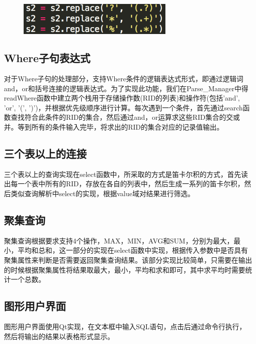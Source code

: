 \begin{figure}[H]
\centering
\includegraphics[width=3in]{Figures/vague.png}
\end{figure}

\subsection{Where子句表达式}

对于Where子句的处理部分，支持Where条件的逻辑表达式形式，即通过逻辑词and，or和括号连接的逻辑表达式。为了实现此功能，我们在Parse\_Manager中得readWhere函数中建立两个栈用于存储操作数(RID的列表)和操作符(包括'and', 'or', '(', ')')，并根据优先级顺序进行计算。每次遇到一个条件，首先通过search函数查找符合此条件的RID的集合，然后通过and，or运算求这些RID集合的交或并。等到所有的条件输入完毕，将求出的RID的集合对应的记录值输出。

\subsection{三个表以上的连接}
三个表以上的查询实现在select函数中，所采取的方式是笛卡尔积的方式，首先读出每一个表中所有的RID，存放在各自的列表中，然后生成一系列的笛卡尔积，然后类似查询解析中select的实现，根据value域对结果进行筛选。

\subsection{聚集查询}
聚集查询根据要求支持4个操作，MAX，MIN，AVG和SUM，分别为最大，最小，平均和总和，这一部分的实现在select函数中实现，根据传入参数中是否具有聚集属性来判断是否需要返回聚集查询结果。该部分实现比较简单，只需要在输出的时候根据聚集属性将结果取最大，最小，平均和求和即可，其中求平均时需要统计一个总数。

\subsection{图形用户界面}
图形用户界面使用Qt实现，在文本框中输入SQL语句，点击后通过命令行执行，然后将输出的结果以表格形式显示。
